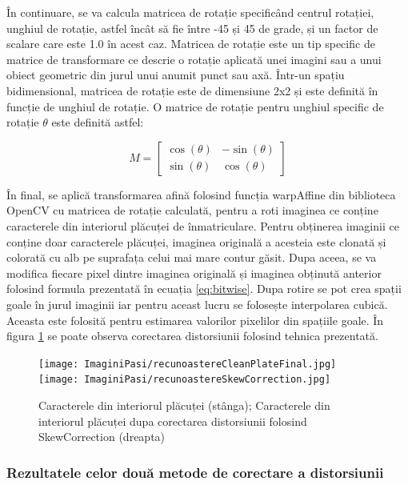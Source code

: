 \documentclass[12pt]{article}
\begin{document}
\^{I}n continuare, se va calcula matricea de rotație specific\^{a}nd centrul rotației, unghiul de rotație, astfel \^{i}nc\^{a}t s\u{a} fie \^{i}ntre -45 și 45 de grade, și un factor de scalare care este 1.0 \^{i}n acest caz. Matricea de rotație este un tip specific de matrice de transformare ce descrie o rotație aplicat\u{a} unei imagini sau a unui obiect geometric din jurul unui anumit punct sau ax\u{a}. \^{I}ntr-un spațiu bidimensional, matricea de rotație este de dimensiune 2x2 și este definit\u{a} \^{i}n funcție de unghiul de rotație. O matrice de rotație pentru unghiul specific de rotație \ensuremath{\theta} este definit\u{a} astfel:

\begin{equation}
M =
\begin{bmatrix}
\cos(\theta) & -\sin(\theta) \\
\sin(\theta) & \cos(\theta)
\end{bmatrix}
\end{equation}

\^{I}n final, se aplic\u{a} transformarea afin\u{a} folosind funcția warpAffine din biblioteca OpenCV cu matricea de rotație calculat\u{a}, pentru a roti imaginea ce conține caracterele din interiorul pl\u{a}cuței de \^{i}nmatriculare. Pentru obținerea imaginii ce conține doar caracterele pl\u{a}cuței, imaginea original\u{a} a acesteia este clonat\u{a} și colorat\u{a} cu alb pe suprafața celui mai mare contur g\u{a}sit. Dupa aceea, se va modifica fiecare pixel dintre imaginea original\u{a} și imaginea obținut\u{a} anterior folosind formula prezentat\u{a} \^{i}n ecuația \ref{eq:bitwise}. Dupa rotire se pot crea spații goale \^{i}n jurul imaginii iar pentru aceast lucru se folosește interpolarea cubic\u{a}. Aceasta este folosit\u{a} pentru estimarea valorilor pixelilor din spațiile goale. \^{I}n figura \ref{fig:recunoastere_rezultat_skew} se poate observa corectarea distorsiunii folosind tehnica prezentat\u{a}.

\begin{figure}[H]
  \centering
  \texttt{[image: ImaginiPasi/recunoastereCleanPlateFinal.jpg]}\hfill
    \texttt{[image: ImaginiPasi/recunoastereSkewCorrection.jpg]}
  \caption{Caracterele din interiorul pl\u{a}cuței (st\^{a}nga); Caracterele din interiorul pl\u{a}cuței dupa corectarea distorsiunii folosind SkewCorrection (dreapta)}
  \label{fig:recunoastere_rezultat_skew}
\end{figure}

\subsubsection{Rezultatele celor dou\u{a} metode de corectare a distorsiunii}
\end{document}
